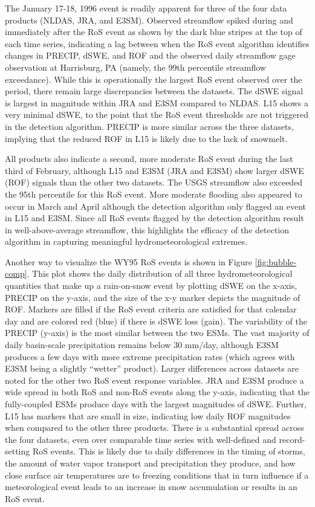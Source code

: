 \documentclass[nhess, manuscript]{copernicus}
\begin{document}
The January 17-18, 1996 event is readily apparent for three of the four data products (NLDAS, JRA, and E3SM). 
Observed streamflow spiked during and immediately after the RoS event as shown by the dark blue stripes at the top of each time series, indicating a lag between when the RoS event algorithm identifies changes in PRECIP, dSWE, and ROF and the observed daily streamflow gage observation at Harrisburg, PA (namely, the 99th percentile streamflow exceedance).
While this is operationally the largest RoS event observed over the period, there remain large discrepancies between the datasets. 
The dSWE signal is largest in magnitude within JRA and E3SM compared to NLDAS. 
L15 shows a very minimal dSWE, to the point that the RoS event thresholds are not triggered in the detection algorithm. 
PRECIP is more similar across the three datasets, implying that the reduced ROF in L15 is likely due to the lack of snowmelt.

All products also indicate a second, more moderate RoS event during the last third of February, although L15 and E3SM (JRA and E3SM) show larger dSWE (ROF) signals than the other two datasets. 
The USGS streamflow also exceeded the 95th percentile for this RoS event. 
More moderate flooding also appeared to occur in March and April although the detection algorithm only flagged an event in L15 and E3SM. 
Since all RoS events flagged by the detection algorithm result in well-above-average streamflow, this highlights the efficacy of the detection algorithm in capturing meaningful hydrometeorological extremes.

Another way to visualize the WY95 RoS events is shown in Figure \ref{fig:bubble-comp}.  
This plot shows the daily distribution of all three hydrometeorological quantities that make up a rain-on-snow event by plotting dSWE on the x-axis, PRECIP on the y-axis, and the size of the x-y marker depicts the magnitude of ROF.
Markers are filled if the RoS event criteria are satisfied for that calendar day and are colored red (blue) if there is dSWE loss (gain). 
The variability of the PRECIP (y-axis) is the most similar between the two ESMs.
The vast majority of daily basin-scale precipitation remains below 30 mm/day, although E3SM produces a few days with more extreme precipitation rates (which agrees with E3SM being a slightly ``wetter'' product). 
Larger differences across datasets are noted for the other two RoS event response variables. 
JRA and E3SM produce a wide spread in both RoS and non-RoS events along the y-axis, indicating that the fully-coupled ESMs produce days with the largest magnitudes of dSWE. 
Further, L15 has markers that are small in size, indicating low daily ROF magnitudes when compared to the other three products.
There is a substantial spread across the four datasets, even over comparable time series with well-defined and record-setting RoS events.
This is likely due to daily differences in the timing of storms, the amount of water vapor transport and precipitation they produce, and how close surface air temperatures are to freezing conditions that in turn influence if a meteorological event leads to an increase in snow accumulation or results in an RoS event.
\end{document}

